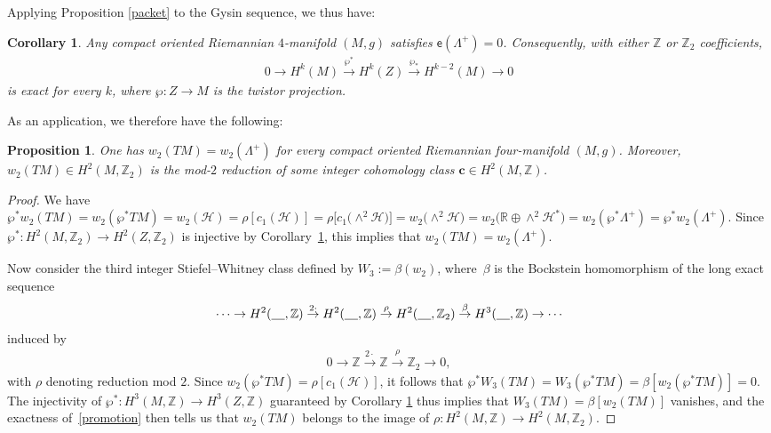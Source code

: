 \documentclass[pdftex]{sigma}
\numberwithin{equation}{section}
\newtheorem{Corollary}[Theorem]{Corollary}
\newtheorem{Proposition}[Theorem]{Proposition}
 { \theoremstyle{definition}
\newtheorem{Definition}[Theorem]{Definition}
\newtheorem*{geomdef}{Geometric Definition}
\newtheorem*{standef}{Standard Definition}
\newtheorem{Example}[Theorem]{Example}
\newtheorem*{xpl}{Example}
\newtheorem{Remark}[Theorem]{Remark} }
\def\ZZ{\mathbb{Z}}
\def\RR{\mathbb{R}}
\begin{document}
Applying Proposition \ref{packet} to the Gysin sequence, we thus have:

\begin{Corollary}\label{sharpie}
Any compact oriented Riemannian $4$-manifold $(M,g)$ satisfies $\mathsf{e} (\Lambda^+)=0$.
Consequently, with either $\ZZ$ or $\ZZ_2$ coefficients,
\begin{gather*}
0\to H^k (M) \stackrel{\wp^*}{\to} H^k (Z) \stackrel{\wp_*}{\to} H^{k-2}(M)\to 0
\end{gather*}
is exact for every $k$, where $\wp\colon Z\to M$ is the twistor projection.
\end{Corollary}

As an application, we therefore have the following:
\begin{Proposition} One has $w_2(TM)= w_2(\Lambda^+)$
for every compact oriented Riemannian four-manifold $(M,g)$. Moreover,
 $w_2(TM)\in H^2(M, \ZZ_2)$ is the mod-$2$ reduction of some integer cohomology class $\mathbf{c}\in H^2(M, \ZZ)$.
\end{Proposition}
\begin{proof}
We have $\wp^* w_2 (TM) = w_2 (\wp^* TM) = w_2 (\mathscr{H}) = \rho [ c_1 (\mathscr{H})] =
 \rho \big[ c_1 \big({\wedge}^{2} \mathscr{H}\big)\big]=
w_2 \big({\wedge}^{2} \mathscr{H}\big)\allowbreak = w_2\big(\RR \oplus \wedge^{2} \mathscr{H}^*\big) = w_2 (\wp^* \Lambda^+) = \wp^* w_2 (\Lambda^+)$.
Since $\wp^*\colon H^2(M, \ZZ_2)\to H^2(Z, \ZZ_2)$ is injective by Corollary~\ref{sharpie}, this implies that $w_2(TM)= w_2(\Lambda^+)$.

Now consider the third {integer} Stiefel--Whitney class defined by
$W_3 := \beta (w_2)$,
where~$\beta$ is the Bockstein homomorphism of the long exact sequence
\begin{gather}\label{promotion}
\cdots \to H^2 (\underline{\hphantom{M}}, \ZZ ) \stackrel{2\cdot}{\to} H^2 (\underline{\hphantom{M}}, \ZZ ) \stackrel{\rho}{\to} H^2 (\underline{\hphantom{M}}, \ZZ_2 ) \stackrel{\beta}{\to} H^3 (\underline{\hphantom{M}}, \ZZ )\to \cdots
\end{gather}
induced by
\begin{gather*}
0\to \ZZ \stackrel{2\cdot}{\to} \ZZ\stackrel{\rho}{\to} \ZZ_2\to 0,
\end{gather*}
with $\rho$ denoting reduction mod $2$.
Since $w_2 (\wp^* TM) = \rho [ c_1 (\mathscr{H})]$, it follows that $\wp^* W_3 (TM)= W_3 (\wp^* TM) =\beta [w_2(\wp^* TM) ]=0$.
The injectivity of $\wp^*\colon H^3(M, \ZZ)\to H^3(Z, \ZZ)$ guaranteed by Corollary \ref{sharpie} thus implies that $W_3(TM)= \beta [w_2(TM) ]$ vanishes,
and the exactness of~\eqref{promotion} then tells us that $w_2(TM)$ belongs to the image of $\rho\colon H^2(M,\ZZ) {\to} H^2(M,\ZZ_2)$.
\end{proof}
\end{document}

